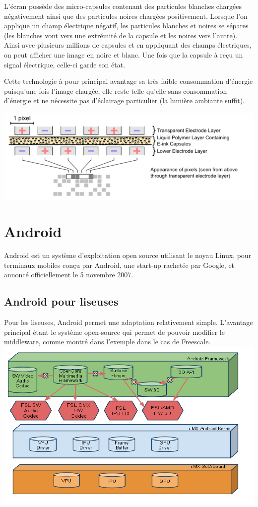 L'écran possède des micro-capsules contenant des particules blanches chargées négativement ainsi que des particules noires chargées positivement. Lorsque l'on applique un champ électrique négatif, les particules blanches et noires se sépares (les blanches vont vers une extrémité de la capsule et les noires vers l'autre). Ainsi avec plusieurs millions de capsules et en appliquant des champs électriques, on peut afficher une image en noire et blanc. Une fois que la capsule à reçu un signal électrique, celle-ci garde son état.

Cette technologie à pour principal avantage sa très faible consommation d'énergie puisqu'une fois l'image chargée, elle reste telle qu'elle sans consommation d'énergie et ne nécessite pas d'éclairage particulier (la lumière ambiante suffit).

\begin{center}
	\includegraphics{Electrophoretic.png}
\end{center}


\section{Android}
Android est un système d'exploitation open source utilisant le noyau Linux, pour terminaux mobiles conçu par Android, une start-up rachetée par Google, et annoncé officiellement le 5 novembre 2007.

\subsection{Android pour liseuses}
Pour les liseuses, Android permet une adaptation relativement simple. L'avantage principal étant le système open-source qui permet de pouvoir modifier le middleware, comme montré dans l'exemple dans le cas de Freescale.\\
\includegraphics[scale=0.45]{Android.png}

